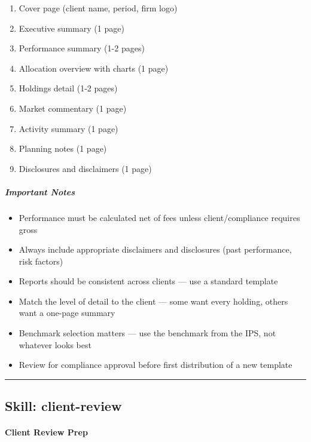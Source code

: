 \documentclass[11pt]{article}
\begin{document}
\begin{enumerate}[leftmargin=*,itemsep=2pt,topsep=2pt]
\item {} Cover page (client name, period, firm logo)
\item {} Executive summary (1 page)
\item {} Performance summary (1-2 pages)
\item {} Allocation overview with charts (1 page)
\item {} Holdings detail (1-2 pages)
\item {} Market commentary (1 page)
\item {} Activity summary (1 page)
\item {} Planning notes (1 page)
\item {} Disclosures and disclaimers (1 page)
\end{enumerate}

\subparagraph{Important Notes}\mbox{}\par

\begin{itemize}[leftmargin=*,itemsep=2pt,topsep=2pt]
\item {} Performance must be calculated net of fees unless client/compliance requires gross
\item {} Always include appropriate disclaimers and disclosures (past performance, risk factors)
\item {} Reports should be consistent across clients — use a standard template
\item {} Match the level of detail to the client — some want every holding, others want a one-page summary
\item {} Benchmark selection matters — use the benchmark from the IPS, not whatever looks best
\item {} Review for compliance approval before first distribution of a new template
\end{itemize}

\vspace{0.8em}\hrule\vspace{0.8em}

\subsection{Skill: client-review}\label{file:skills-client-review-SKILL.md}

\paragraph{Client Review Prep}\mbox{}\par
\end{document}
